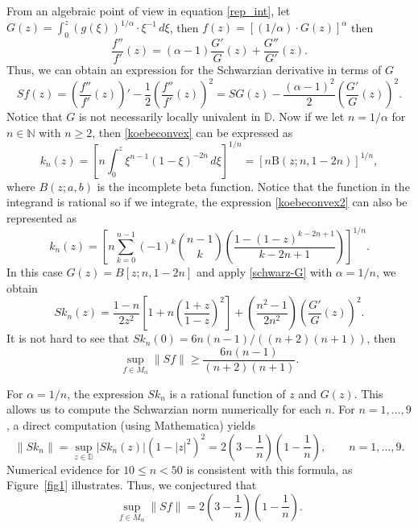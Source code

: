\documentclass[reqno]{amsart}
\theoremstyle{plain}
\theoremstyle{definition}
\newcommand{\D}{\mathbb{D}}
\begin{document}
From an algebraic point of view in equation \eqref{rep_int}, let $G(z)=\int_0^z(g(\xi))^{1/\alpha}\cdot\xi^{-1}\,d\xi$, then $f(z)=[(1/\alpha)\cdot G(z)]^\alpha$ then
\begin{equation*}
    \dfrac{f''}{f'}(z)=(\alpha-1)\dfrac{G'}{G}(z)+\dfrac{G''}{G'}(z).
\end{equation*}
Thus, we can obtain an expression for the Schwarzian derivative in terms of $G$
\begin{equation}\label{schwarz-G}
    Sf(z)=\left(\dfrac{f''}{f'}(z)\right)'-\dfrac{1}{2}\left(\dfrac{f''}{f'}(z)\right)^2=SG(z)-\dfrac{(\alpha-1)^2}{2}\left(\dfrac{G'}{G}(z)\right)^2.
\end{equation}
Notice that $G$ is not necessarily locally univalent in $\D$. Now if we let $n=1/\alpha$ for $n\in\mathbb{N}$ with $n\geq 2$, then \eqref{koebeconvex} can be expressed as
\begin{equation}\label{koebeconvex2}
    k_n(z)=\left[n\int_0^z \xi^{n-1}(1-\xi)^{-2n}\,d\xi\right]^{1/n}=[n\text{B}(z;n,1-2n)]^{1/n},
\end{equation}
where $B(z;a,b)$ is the incomplete beta function. Notice that the function in the integrand is rational so if we integrate, the expression \eqref{koebeconvex2} can also be represented as
\begin{equation*}
    k_n(z)=\left[n\sum_{k=0}^{n-1}(-1)^k\binom{n-1}{k}\left(\dfrac{1-(1-z)^{k-2n+1}}{k-2n+1}\right)\right]^{1/n}.
\end{equation*}
In this case $G(z)=B[z;n,1-2n]$ and apply \eqref{schwarz-G} with $\alpha=1/n$, we obtain
\begin{equation}\label{Schwarz-k}
    Sk_n(z)=\dfrac{1-n}{2z^2}\left[1+n\left(\dfrac{1+z}{1-z}\right)^2\right]+\left(\dfrac{n^2-1}{2n^2}\right)\left(\dfrac{G'}{G}(z)\right)^2.
\end{equation}
It is not hard to see that $Sk_n(0)=6n(n-1)/((n+2)(n+1))$, then $$\sup_{f\in M_\alpha}\|Sf\|\geq \frac{6n(n-1)}{(n+2)(n+1)}.$$

For $\alpha = 1/n$, the expression $Sk_n$ is a rational function of $z$ and $G(z)$. This allows us to compute the Schwarzian norm numerically for each $n$. For $n = 1, \ldots, 9$, a direct computation (using Mathematica) yields
\begin{equation}\label{schwarz-k-n}\|Sk_n\|=\sup_{z\in\D}|Sk_n(z)|(1-|z|^2)^2=2\left(3-\frac1n\right)\left(1-\frac1n\right), \quad \quad n=1,\ldots, 9.\end{equation}
Numerical evidence for $10 \leq n < 50$ is consistent with this formula, as Figure~\ref{fig1} illustrates. Thus, we conjectured that $$\sup_{f\in M_\alpha}\|Sf\|=2\left(3-\frac1n\right)\left(1-\frac1n\right).$$
\end{document}
